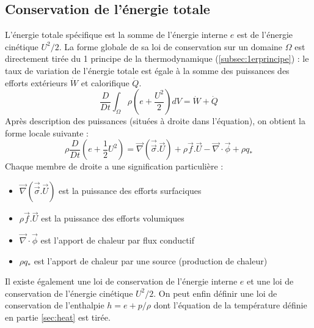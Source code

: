 \subsection{Conservation de l'énergie totale}
L'énergie totale spécifique est la somme de l'énergie interne $e$ est de l'énergie cinétique $U^2/2$. La forme globale de sa loi de conservation sur un domaine $\Omega$ est directement tirée du 1 principe de la thermodynamique (\ref{subsec:1erprincipe}) : le taux de variation de l'énergie totale est égale à la somme des puissances des efforts extérieurs $\dot{W}$ et calorifique $\dot{Q}$.
%
\begin{equation}
    \frac{D}{Dt} \int_{\Omega} \rho \left( e + \frac{U^2}{2} \right) dV = \dot{W} + \dot{Q}
\end{equation}
%
Après description des puissances (situées à droite dans l'équation), on obtient la forme locale suivante :
%
\begin{equation}
    \rho \frac{D}{Dt} \left( e + \frac{1}{2}U^2 \right)
    = \vec{\nabla} \left( \vec{\vec{\sigma}} . \vec{U} \right)
    + \rho \vec{f} . \vec{U}
    - \vec{\nabla} \cdot \vec{\phi}
    + \rho q_*
\end{equation}
%
Chaque membre de droite a une signification particulière :

\begin{itemize}
    \item $\vec{\nabla} \left( \vec{\vec{\sigma}} . \vec{U} \right)$ est la puissance des efforts surfaciques
    \item $\rho \vec{f} . \vec{U}$ est la puissance des efforts volumiques
    \item $\vec{\nabla} \cdot \vec{\phi}$ est l'apport de chaleur par flux conductif
    \item $\rho q_*$ est l'apport de chaleur par une source (production de chaleur)
\end{itemize}

Il existe également une loi de conservation de l'énergie interne $e$ et une loi de conservation de l'énergie cinétique $U^2/2$. On peut enfin définir une loi de conservation de l'enthalpie $h = e + p/\rho$ dont l'équation de la température définie en partie \ref{sec:heat} est tirée.
